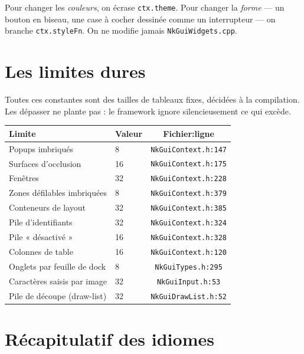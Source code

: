 \begin{nkretenir}
Pour changer les \emph{couleurs}, on écrase \texttt{ctx.theme}. Pour changer la
\emph{forme} — un bouton en biseau, une case à cocher dessinée comme un
interrupteur — on branche \texttt{ctx.styleFn}. On ne modifie jamais
\texttt{NkGuiWidgets.cpp}.
\end{nkretenir}

\section{Les limites dures}

Toutes ces constantes sont des tailles de tableaux fixes, décidées à la
compilation. Les dépasser ne plante pas : le framework ignore silencieusement
ce qui excède.

\begin{center}
\begin{tabular}{@{}llc@{}}
\toprule
\textbf{Limite} & \textbf{Valeur} & \textbf{Fichier:ligne} \\
\midrule
Popups imbriqués          & 8   & \texttt{NkGuiContext.h:147} \\
Surfaces d'occlusion      & 16  & \texttt{NkGuiContext.h:175} \\
Fenêtres                  & 32  & \texttt{NkGuiContext.h:228} \\
Zones défilables imbriquées & 8 & \texttt{NkGuiContext.h:379} \\
Conteneurs de layout      & 32  & \texttt{NkGuiContext.h:385} \\
Pile d'identifiants       & 32  & \texttt{NkGuiContext.h:324} \\
Pile « désactivé »        & 16  & \texttt{NkGuiContext.h:328} \\
Colonnes de table         & 16  & \texttt{NkGuiContext.h:120} \\
Onglets par feuille de dock & 8 & \texttt{NkGuiTypes.h:295} \\
Caractères saisis par image & 32 & \texttt{NkGuiInput.h:53} \\
Pile de découpe (draw-list) & 32 & \texttt{NkGuiDrawList.h:52} \\
\bottomrule
\end{tabular}
\end{center}

\section{Récapitulatif des idiomes}


